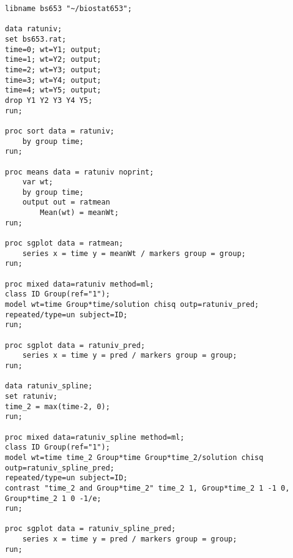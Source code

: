 \documentclass{article}[12pt]
\begin{document}
\begin{lstlisting}
libname bs653 "~/biostat653";

data ratuniv;
set bs653.rat;
time=0; wt=Y1; output;
time=1; wt=Y2; output;
time=2; wt=Y3; output;
time=3; wt=Y4; output;
time=4; wt=Y5; output;
drop Y1 Y2 Y3 Y4 Y5;
run;

proc sort data = ratuniv;
	by group time;
run;

proc means data = ratuniv noprint;
	var wt;
	by group time;
	output out = ratmean 
		Mean(wt) = meanWt;
run;

proc sgplot data = ratmean;
	series x = time y = meanWt / markers group = group;
run;

proc mixed data=ratuniv method=ml;
class ID Group(ref="1");
model wt=time Group*time/solution chisq outp=ratuniv_pred;
repeated/type=un subject=ID;
run;

proc sgplot data = ratuniv_pred;
	series x = time y = pred / markers group = group;
run;

data ratuniv_spline;
set ratuniv;
time_2 = max(time-2, 0);
run;

proc mixed data=ratuniv_spline method=ml;
class ID Group(ref="1");
model wt=time time_2 Group*time Group*time_2/solution chisq outp=ratuniv_spline_pred;
repeated/type=un subject=ID;
contrast "time_2 and Group*time_2" time_2 1, Group*time_2 1 -1 0, Group*time_2 1 0 -1/e;
run;

proc sgplot data = ratuniv_spline_pred;
	series x = time y = pred / markers group = group;
run;
\end{lstlisting}
\end{document}
